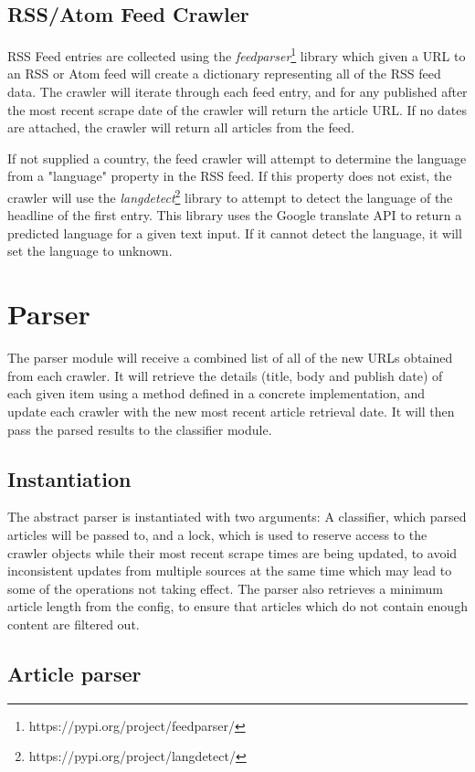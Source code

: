 \documentclass{l4proj}
\begin{document}
\subsection{RSS/Atom Feed Crawler}
RSS Feed entries are collected using the \emph{feedparser}\footnote{https://pypi.org/project/feedparser/} library which given a URL to an RSS or Atom feed will create a dictionary representing all of the RSS feed data. The crawler will iterate through each feed entry, and for any published after the most recent scrape date of the crawler will return the article URL. If no dates are attached, the crawler will return all articles from the feed. \par
If not supplied a country, the feed crawler will attempt to determine the language from a "language" property in the RSS feed. If this property does not exist, the crawler will use the \emph{langdetect}\footnote{https://pypi.org/project/langdetect/} library to attempt to detect the language of the headline of the first entry. This library uses the Google translate API to return a predicted language for a given text input. If it cannot detect the language, it will set the language to unknown.


\section{Parser}
The parser module will receive a combined list of all of the new URLs obtained from each crawler. It will retrieve the details (title, body and publish date) of each given item using a method defined in a concrete implementation, and update each crawler with the new most recent article retrieval date. It will then pass the parsed results to the classifier module.
\subsection{Instantiation}
The abstract parser is instantiated with two arguments: A classifier, which parsed articles will be passed to, and a lock, which is used to reserve access to the crawler objects while their most recent scrape times are being updated, to avoid inconsistent updates from multiple sources at the same time which may lead to some of the operations not taking effect. The parser also retrieves a minimum article length from the config, to ensure that articles which do not contain enough content are filtered out.
\subsection{Article parser}
\end{document}
